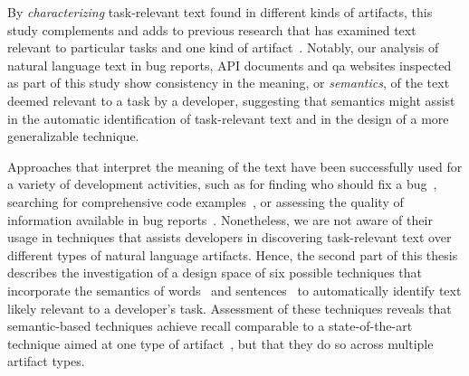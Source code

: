 % 

By \textit{characterizing} task-relevant text found in different kinds of artifacts,
this study complements and adds to previous research that has
examined text relevant to particular tasks and one kind of artifact~\cite{Ko2006, Rastkar2010, Chaparro2017, Robillard2015}.
Notably, our analysis of natural language text  in bug
reports, API documents and \ac{qa} websites 
inspected as part of this study 
 show consistency in the meaning, or \textit{semantics}, of the
 text deemed relevant to a task by a developer, suggesting that 
semantics might assist in the automatic identification of
task-relevant text and in the design of a more generalizable technique.




Approaches that interpret the meaning of the text have been successfully used for a variety of development activities,
such as for finding who should fix a bug~\cite{yang2016}, searching for comprehensive code examples~\cite{silva2019}, or assessing the quality of information available in bug reports~\cite{chaparro2019}.
Nonetheless, we are not aware of their usage in techniques 
that assists developers in discovering task-relevant text over different types of natural language artifacts.
Hence, the second part of this thesis describes 
the investigation of a design space
of six possible techniques that incorporate the semantics of words~\cite{Mikolov2013, Devlin2018Bert}
and sentences~\cite{fillmore1976frame, marques2021}
to automatically identify text likely relevant to a developer's task.
Assessment of these techniques reveals that semantic-based techniques
achieve recall comparable to a state-of-the-art technique aimed at one type of artifact~\cite{Xu2017}, but 
that they do so across
multiple artifact types.








